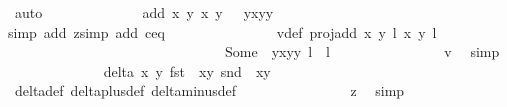 \begin{isabellebody}
\ auto\isanewline
\ \ \ \ \ \ \ \ \ \ \ \ \isamarkupfalse%
\ {\isachardoublequoteopen}add\ {\isacharparenleft}x{\isacharcomma}\ y{\isacharparenright}\ {\isacharparenleft}x{\isacharprime}{\isacharcomma}\ y{\isacharprime}{\isacharparenright}\ {\isacharequal}\ {\isasymrho}\ {\isacharparenleft}y{\isacharasterisk}x{\isacharprime}{\isacharcomma}y{\isacharasterisk}y{\isacharprime}{\isacharparenright}{\isachardoublequoteclose}\isanewline
\ \ \ \ \ \ \ \ \ \ \ \ \ \ \isamarkupfalse%
{\isacharparenleft}simp\ add{\isacharcolon}\ z{}{\isacharcomma}simp\ add{\isacharcolon}\ c{\isacharunderscore}eq{\isacharunderscore}{}{\isacharparenright}\isanewline
\ \ \ \ \ \ \ \ \ \ \ \ \isamarkupfalse%
\ \isamarkupfalse%
\ v{}{\isacharunderscore}def{\isacharcolon}\ {\isachardoublequoteopen}proj{\isacharunderscore}add\ {\isacharparenleft}{\isacharparenleft}x{\isacharcomma}\ y{\isacharparenright}{\isacharcomma}\ l{\isacharparenright}\ {\isacharparenleft}{\isacharparenleft}x{\isacharprime}{\isacharcomma}\ y{\isacharprime}{\isacharparenright}{\isacharcomma}\ l{\isacharprime}{\isacharparenright}\ {\isacharequal}\ \isanewline
\ \ \ \ \ \ \ \ \ \ \ \ \ \ \ \ \ \ \ \ \ \ \ \ \ \ \ \ \ \ \ Some\ {\isacharparenleft}{\isasymrho}\ {\isacharparenleft}y{\isacharasterisk}x{\isacharprime}{\isacharcomma}y{\isacharasterisk}y{\isacharprime}{\isacharparenright}{\isacharcomma}\ l\ {\isacharplus}\ l{\isacharprime}{\isacharparenright}{\isachardoublequoteclose}\isanewline
\ \ \ \ \ \ \ \ \ \ \ \ \ \ \isamarkupfalse%
\ v{}\ \isamarkupfalse%
\ simp\isanewline
\ \ \ \ \ \ \ \ \ \ \ \ \isamarkupfalse%
\ {\isachardoublequoteopen}delta\ x\ y\ {\isacharparenleft}fst\ {\isacharparenleft}{\isasymtau}\ {\isacharparenleft}x{\isacharprime}{\isacharcomma}y{\isacharprime}{\isacharparenright}{\isacharparenright}{\isacharparenright}\ {\isacharparenleft}snd\ {\isacharparenleft}{\isasymtau}\ {\isacharparenleft}x{\isacharprime}{\isacharcomma}y{\isacharprime}{\isacharparenright}{\isacharparenright}{\isacharparenright}\ {\isasymnoteq}\ {}{\isachardoublequoteclose}\isanewline
\ \ \ \ \ \ \ \ \ \ \ \ \ \ \isamarkupfalse%
\ delta{\isacharunderscore}def\ delta{\isacharunderscore}plus{\isacharunderscore}def\ delta{\isacharunderscore}minus{\isacharunderscore}def\isanewline
\ \ \ \ \ \ \ \ \ \ \ \ \ \ \isamarkupfalse%
\ z{}\ \isamarkupfalse%
\ simp\isanewline
\ \ \ \ \ \ \ \ \ \ \ \ \isamarkupfalse%

\end{isabellebody}
